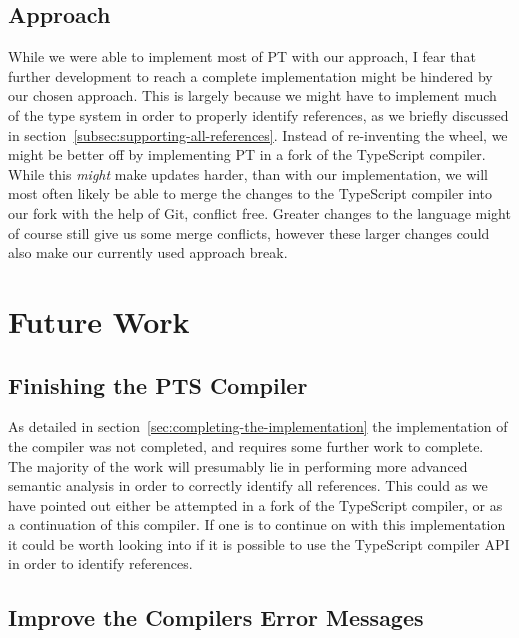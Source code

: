 \subsection{Approach}\label{subsec:result-approach}

While we were able to implement most of PT with our approach, I fear that further development to reach a complete implementation might be hindered by our chosen approach.
This is largely because we might have to implement much of the type system in order to properly identify references, as we briefly discussed in section~\vref{subsec:supporting-all-references}.
Instead of re-inventing the wheel, we might be better off by implementing PT in a fork of the TypeScript compiler.
While this \textit{might} make updates harder, than with our implementation, we will most often likely be able to merge the changes to the TypeScript compiler into our fork with the help of Git, conflict free.
Greater changes to the language might of course still give us some merge conflicts, however these larger changes could also make our currently used approach break.

\section{Future Work}\label{sec:future-work}

\subsection{Finishing the PTS Compiler}\label{subsec:finishing-the-pts-compiler}

As detailed in section~\vref{sec:completing-the-implementation} the implementation of the compiler was not completed, and requires some further work to complete.
The majority of the work will presumably lie in performing more advanced semantic analysis in order to correctly identify all references.
This could as we have pointed out either be attempted in a fork of the TypeScript compiler, or as a continuation of this compiler.
If one is to continue on with this implementation it could be worth looking into if it is possible to use the TypeScript compiler API in order to identify references.

\subsection{Improve the Compilers Error Messages}\label{subsec:compiler-with-focus-on-error-messages}

